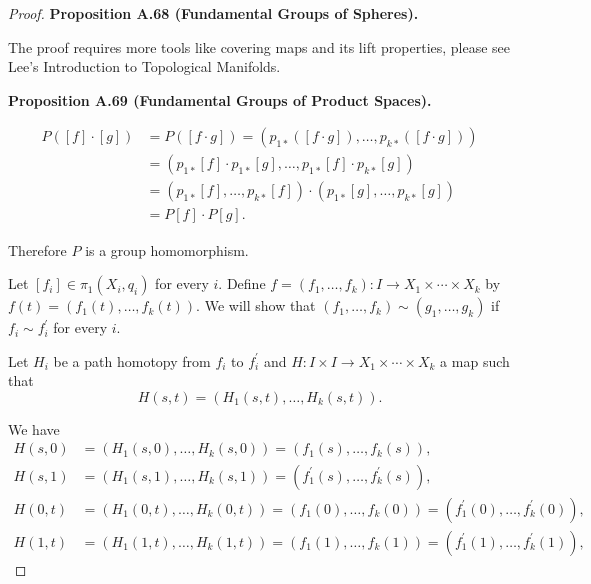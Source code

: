 \begin{proof}
    \textbf{Proposition A.68 (Fundamental Groups of Spheres).}

    The proof requires more tools like covering maps and its lift properties, please see Lee's Introduction to Topological Manifolds.

    \textbf{Proposition A.69 (Fundamental Groups of Product Spaces).}

    \begingroup
    \allowdisplaybreaks%
    \begin{align*}
        P([f] \cdot [g]) & = P([f\cdot g]) = (p_{1\ast}([f\cdot g]), \ldots, p_{k\ast}([f\cdot g]))          \\
                         & = (p_{1\ast}[f] \cdot p_{1\ast}[g], \ldots, p_{1\ast}[f]\cdot p_{k\ast}[g])       \\
                         & = (p_{1\ast}[f], \ldots, p_{k\ast}[f]) \cdot (p_{1\ast}[g], \ldots, p_{k\ast}[g]) \\
                         & = P[f] \cdot P[g].
    \end{align*}
    \endgroup

    Therefore \( P \) is a group homomorphism.

    Let \( [f_{i}] \in \pi_{1}(X_{i}, q_{i}) \) for every \( i \). Define \( f = (f_{1}, \ldots, f_{k}): I \to X_{1} \times \cdots \times X_{k} \) by \( f(t) = (f_{1}(t), \ldots, f_{k}(t)) \). We will show that \( (f_{1}, \ldots, f_{k}) \sim (g_{1}, \ldots, g_{k}) \) if \( f_{i} \sim f_{i}^{\prime} \) for every \( i \).

    Let \( H_{i} \) be a path homotopy from \( f_{i} \) to \( f_{i}^{\prime} \) and \( H: I \times I \to X_{1} \times \cdots \times X_{k} \) a map such that
    \[
        H(s, t) = (H_{1}(s, t), \ldots, H_{k}(s, t)).
    \]

    We have
    \begingroup
    \allowdisplaybreaks%
    \begin{align*}
        H(s, 0) & = (H_{1}(s, 0), \ldots, H_{k}(s, 0)) = (f_{1}(s), \ldots, f_{k}(s)),                                                  \\
        H(s, 1) & = (H_{1}(s, 1), \ldots, H_{k}(s, 1)) = (f_{1}^{\prime}(s), \ldots, f_{k}^{\prime}(s)),                                \\
        H(0, t) & = (H_{1}(0, t), \ldots, H_{k}(0, t)) = (f_{1}(0), \ldots, f_{k}(0)) = (f_{1}^{\prime}(0), \ldots, f_{k}^{\prime}(0)), \\
        H(1, t) & = (H_{1}(1, t), \ldots, H_{k}(1, t)) = (f_{1}(1), \ldots, f_{k}(1)) = (f_{1}^{\prime}(1), \ldots, f_{k}^{\prime}(1)),
    \end{align*}
    \endgroup


\end{proof}
